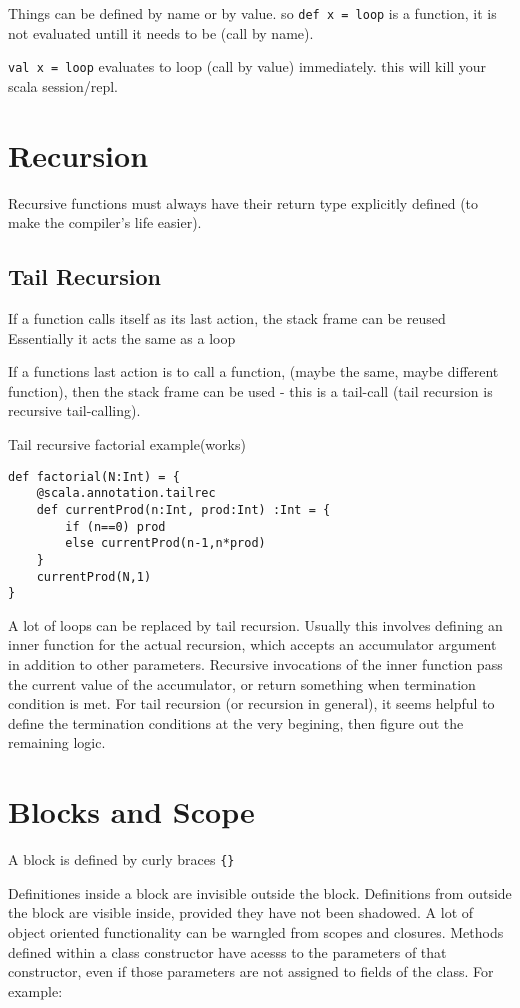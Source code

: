 Things can be defined by name or by value.
so \lstinline|def x = loop| is a function, it is not evaluated untill it needs to be (call by name). 

\lstinline|val x = loop| evaluates to loop (call by value) immediately. this will kill your scala session/repl.

\section{Recursion}
Recursive functions must always have their return type explicitly defined (to make the compiler's life easier).

\subsection{Tail Recursion}
If a function calls itself as its last action, the stack frame can be reused
Essentially it acts the same as a loop

If a functions last action is to call a function, (maybe the same, maybe different function), then the stack frame can be used - this is a tail-call (tail recursion is recursive tail-calling).

Tail recursive factorial example(works)

\begin{lstlisting}
def factorial(N:Int) = {
    @scala.annotation.tailrec
    def currentProd(n:Int, prod:Int) :Int = {
        if (n==0) prod
        else currentProd(n-1,n*prod)
    }
    currentProd(N,1)
}
\end{lstlisting}

A lot of loops can be replaced by tail recursion. Usually this involves defining an inner function for the actual recursion, which accepts an accumulator argument in addition to other parameters. Recursive invocations of the inner function pass the current value of the accumulator, or return something when termination condition is met. For tail recursion (or recursion in general), it seems helpful to define the termination conditions at the very begining, then figure out the remaining logic.

\section{Blocks and Scope}
A block is defined by curly braces \lstinline|{}|

Definitiones inside a block are invisible outside the block. 
Definitions from outside the block are visible inside, provided they have not been shadowed.
A lot of object oriented functionality can be warngled from scopes and closures. Methods defined within a class constructor have acesss to the parameters of that constructor, even if those parameters are not assigned to fields of the class. 
For example:

